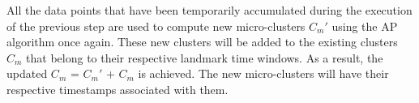 \documentclass[../UNBThesis2.tex]{subfiles}
\begin{document}
\begin{itemize}[leftmargin=*]
    
    
    
    
    
    All the data points that have been temporarily accumulated during the execution of the previous step are used to compute new micro-clusters $C_m'$ using the AP algorithm once again. These new clusters will be added to the existing clusters $C_m$ that belong to their respective landmark time windows. As a result, the updated $C_m$ = $C_m'$ + $C_m$ is achieved. The new micro-clusters will have their respective timestamps associated with them.
    


\end{itemize}
\end{document}
